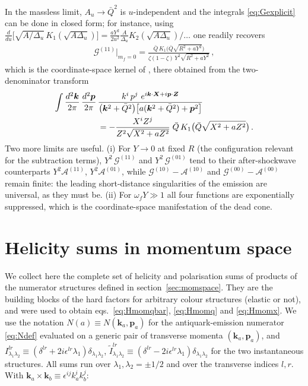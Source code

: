 \documentclass[11pt,a4paper]{article}
\newcommand{\calG}{\mathcal{G}}
\newcommand{\calA}{\mathcal{A}}
\newcommand{\vX}{\bm{X}}
\newcommand{\vk}{\bm{k}}
\newcommand{\vp}{\bm{p}}
\newcommand{\Qb}{\bar{Q}}
\numberwithin{equation}{section}
\begin{document}
In the massless limit, $A_u\to\Qb^2$ is $u$-independent and the integrals
\eqref{eq:Gexplicit} can be done in closed form; for instance, using
$\frac{d}{du}\big[\sqrt{{A}/{\Delta_u}}\,K_1(\sqrt{A\Delta_u})\big]
=\frac{aY^2}{2u^2}\frac{A}{\Delta_u}K_2(\sqrt{A\Delta_u})/\ldots$ one readily recovers
\begin{align}
\calG^{(11)}\Big|_{m_f=0} = \frac{\Qb\,K_{1}\big(\Qb\sqrt{R^{2}+aY^{2}}\big)}
{\zeta(1-\zeta)\,Y^{2}\sqrt{R^{2}+aY^{2}}}\,,
\end{align}
which is the coordinate-space kernel of \cite{Iancu:2022gpw}, there obtained from the
two-denominator transform
\begin{align}
\int \frac{d^{2}\vk}{2\pi}\, \frac{d^{2}\vp}{2\pi}\,&
\frac{k^{i}\,p^{j}\ e^{i\vk\cdot \vX + i\vp\cdot \bm{Z}}}
{\big(\vk^{2}+\Qb^2\big)\big[a(\vk^{2}+\Qb^2)+\vp^{2}\big]} \notag\\
&= -\frac{X^{i}Z^{j}}{Z^{2}\sqrt{X^{2}+aZ^{2}}}\;\Qb\,
K_{1}\big(\Qb\sqrt{X^{2}+aZ^{2}}\big)\,.
\end{align}
Two more limits are useful. (i) For $Y\to 0$ at fixed $R$ (the configuration relevant for
the subtraction terms), $Y^{2}\,\calG^{(11)}$ and $Y^{2}\,\calG^{(01)}$ tend to their
after-shockwave counterparts $Y^2\calA^{(11)}$, $Y^2\calA^{(01)}$, while
$\calG^{(10)}-\calA^{(10)}$ and $\calG^{(00)}-\calA^{(00)}$ remain finite: the leading
short-distance singularities of the emission are universal, as they must be. (ii) For
$\omega_f Y\gg1$ all four functions are exponentially suppressed, which is the
coordinate-space manifestation of the dead cone.

\section{Helicity sums in momentum space}
\label{app:helicity}

We collect here the complete set of helicity and polarisation sums of products of the
numerator structures defined in section~\ref{sec:momspace}. They are the building blocks of
the hard factors for arbitrary colour structures (elastic or not), and were used to obtain
eqs.~\eqref{eq:Hmomqbar}, \eqref{eq:Hmomq} and \eqref{eq:Hmomx}. We use the notation
$N(a)\equiv N(\vk_a,\vp_a)$ for the antiquark-emission numerator \eqref{eq:Ndef} evaluated on
a generic pair of transverse momenta $(\vk_a,\vp_a)$, and
$I^{lr}_{\lambda_1\lambda_2}\equiv(\delta^{lr}+2i\epsilon^{lr}\lambda_{1})
\delta_{\lambda_{1}\lambda_{2}}$, $\widetilde I^{lr}_{\lambda_1\lambda_2}\equiv
(\delta^{lr}-2i\epsilon^{lr}\lambda_{1})\delta_{\lambda_{1}\lambda_{2}}$ for the two
instantaneous structures. All sums run over $\lambda_1,\lambda_2=\pm1/2$ and over the
transverse indices $l,r$. With $\vk_a\times\vk_b\equiv\epsilon^{ij}k_a^ik_b^j$:
\end{document}
